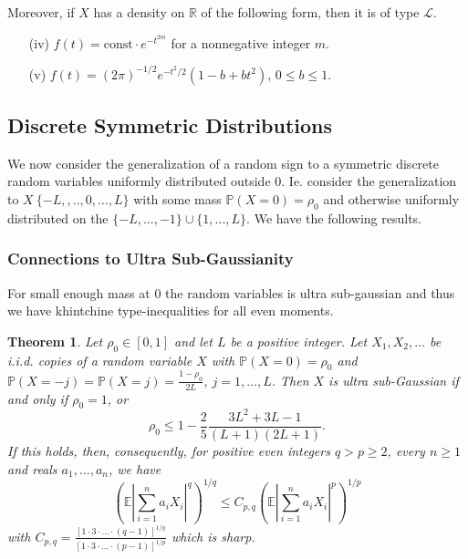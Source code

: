 \documentclass[10pt]{article}
\newcommand{\Pp}{\mathbb{P}}
\newcommand{\E}{\mathbb{E}}
\newcommand{\1}{\textbf{1}}
\newcommand{\R}{\mathbb{R}}
\newcommand{\p}[1]{\mathbb{P}\left( #1 \right)}
\newtheorem{theorem}{Theorem}
\theoremstyle{remark}
\theoremstyle{definition}
\begin{document}
\begin{enumerate}[(a)]
Moreover, if $X$ has a density on $\R$ of the following form, then it is of type $\mathcal{L}$.

\begin{enumerate}
\item[(iv)] $f(t) = \text{const}\cdot e^{-t^{2m}}$ for a nonnegative integer $m$.  

\item[(v)] $f(t) = (2\pi)^{-1/2}e^{-t^2/2}(1-b+ bt^2)$, $0 \leq b \leq 1$.
\end{enumerate}


\end{enumerate}


\subsection{Discrete Symmetric Distributions}

We now consider the generalization of a random sign to a symmetric discrete random variables uniformly distributed outside 0. Ie. consider the generalization to $X ~ \{-L,,..,0,...,L\}$ with some mass $\Pp(X = 0) = \rho_0$ and otherwise uniformly distributed on the $\{-L,...,-1\} \cup \{1,...,L\}$. We have the following results.

\subsubsection{Connections to Ultra Sub-Gaussianity}

For small enough mass at 0 the random variables is ultra sub-gaussian and thus we have khintchine type-inequalities for all even moments.

\begin{theorem}\label{thm:USG}
Let $\rho_0 \in [0,1]$ and let $L$ be a positive integer. Let $X_1, X_2,\dots$ be i.i.d. copies of a random variable $X$ with $\p{X=0} = \rho_0$ and $\p{X = -j} = \p{X = j} = \frac{1-\rho_0}{2L}$, $j = 1,\dots,L$. Then $X$ is ultra sub-Gaussian if and only if $\rho_0 = 1$, or
\begin{equation}\label{eq:USG-rho}
\rho_0 \leq 1 - \frac{2}{5}\frac{3L^2+3L-1}{(L+1)(2L+1)}.
\end{equation}
If this holds, then, consequently, for positive even integers $q > p \geq 2$, every $n \geq 1$ and reals $a_1,\dots,a_n$, we have
\begin{equation}\label{eq:Khin-even}
\left(\E\left|\sum_{i=1}^n a_iX_i\right|^q\right)^{1/q} \leq C_{p,q}\left(\E\left|\sum_{i=1}^n a_iX_i\right|^p\right)^{1/p}
\end{equation}
with $C_{p,q} = \frac{[1\cdot 3\cdot\ldots \cdot (q-1)]^{1/q}}{[1\cdot 3\cdot\ldots \cdot (p-1)]^{1/p}}$ which is sharp.
\end{theorem}
\end{document}
